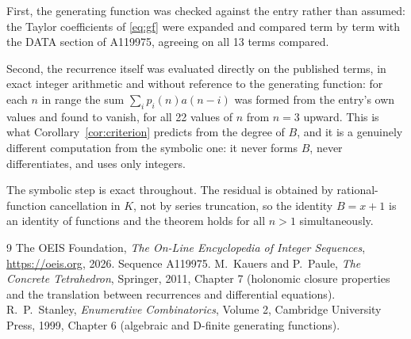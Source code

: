 \documentclass[11pt,a4paper]{article}
\theoremstyle{plain}
\theoremstyle{definition}
\begin{document}
First, the generating function was checked against the entry rather than assumed: the
Taylor coefficients of \eqref{eq:gf} were expanded and compared term by term with the DATA
section of A119975, agreeing on all 13 terms compared.

Second, the recurrence itself was evaluated directly on the published terms, in exact
integer arithmetic and without reference to the generating function: for each $n$ in range
the sum $\sum_{i}p_{i}(n)a(n-i)$ was formed from the entry's own values and found to
vanish, for all 22 values of $n$ from $n=3$ upward. This is what
Corollary~\ref{cor:criterion} predicts from the degree of $B$, and it is a genuinely
different computation from the symbolic one: it never forms $B$, never differentiates, and
uses only integers.

The symbolic step is exact throughout. The residual is obtained by rational-function
cancellation in $K$, not by series truncation, so the identity $B=x + 1$ is an
identity of functions and the theorem holds for all $n>1$ simultaneously.

\begin{thebibliography}{9}
 The OEIS Foundation, \emph{The On-Line Encyclopedia of Integer Sequences},
\url{https://oeis.org}, 2026. Sequence A119975.
 M.~Kauers and P.~Paule, \emph{The Concrete Tetrahedron}, Springer, 2011,
Chapter 7 (holonomic closure properties and the translation between recurrences and
differential equations).
 R.~P.~Stanley, \emph{Enumerative Combinatorics}, Volume 2, Cambridge
University Press, 1999, Chapter 6 (algebraic and D-finite generating functions).
\end{thebibliography}
\end{document}
